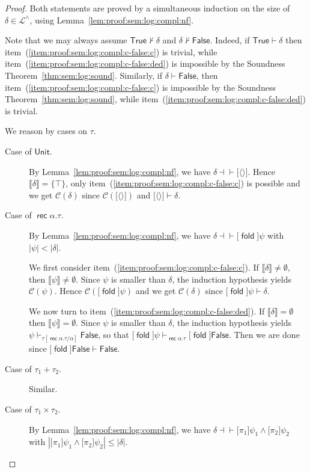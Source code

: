 \documentclass[%
  a4paper,
  UKenglish,
  cleveref,
  autoref,
  thm-restate,
  numberwithinsect,
]{lipics-v2021}
\newcommand\thesis{\vdash}
\newcommand\defthesisiff{\dashv\vdash}
\newcommand\thesisiff{\mathrel{\defthesisiff}}
\newcommand\pair[1]{{\langle #1\rangle}}
\newcommand\I[1]{\llbracket #1 \rrbracket} %
\newcommand\C{\mathcal{C}}		%
\newcommand\temp[1]{\mathsf{#1}}
\newcommand\True{\temp{True}}
\newcommand\False{\temp{False}}
\newcommand\term[1]{\mathsf{#1}}
\newcommand\type[1]{\term{#1}}
\newcommand\fold{\mathop{\term{fold}}}
\newcommand\Unit{\type{Unit}}
\newcommand\rec{\mathop{\type{rec}}}	%
\newcommand\TV{\alpha}		%
\newcommand\PT{\tau}		%
\newcommand\Lang{\mathcal{L}}
\newcommand\form[1]{\lbrack #1 \rbrack}
\begin{document}
\begin{proof}
Both statements are proved by a simultaneous induction on the 
size of $\delta \in \Lang^\land$,
using Lemma~\ref{lem:proof:sem:log:compl:nf}.

Note that we may always assume $\True \not\thesis \delta$
and $\delta \not\thesis \False$.
Indeed, if $\True \thesis \delta$ then
item~(\ref{item:proof:sem:log:compl:c-false:c}) is trivial,
while 
item~(\ref{item:proof:sem:log:compl:c-false:ded})
is impossible by the Soundness Theorem~\ref{thm:sem:log:sound}.
Similarly, if $\delta \thesis \False$,
then
item~(\ref{item:proof:sem:log:compl:c-false:c})
is impossible by the Soundness Theorem~\ref{thm:sem:log:sound},
while 
item~(\ref{item:proof:sem:log:compl:c-false:ded})
is trivial.

We reason by cases on $\PT$.
\begin{description}
\item[Case of $\Unit$.]
By Lemma~\ref{lem:proof:sem:log:compl:nf},
we have $\delta \thesisiff \form{\pair{}}$.
Hence $\I\delta = \{\top\}$,
only item~(\ref{item:proof:sem:log:compl:c-false:c})
is possible
and we get $\C(\delta)$ since $\C(\form{\pair{}})$ and $\form{\pair{}} \thesis \delta$.

\item[Case of $\rec\TV.\PT$.]
By Lemma~\ref{lem:proof:sem:log:compl:nf},
we have $\delta \thesisiff \form\fold\psi$
with $|\psi| < |\delta|$.

We first consider item~(\ref{item:proof:sem:log:compl:c-false:c}).
If $\I\delta \neq \emptyset$,
then $\I{\psi} \neq \emptyset$.
Since
$\psi$ is smaller than $\delta$,
the induction hypothesis
yields $\C(\psi)$.
Hence $\C(\form\fold \psi)$
and we get $\C(\delta)$ since $\form\fold \psi \thesis \delta$.

We now turn to item~(\ref{item:proof:sem:log:compl:c-false:ded}).
If $\I\delta = \emptyset$ then
$\I{\psi} = \emptyset$.
Since $\psi$ is smaller than $\delta$,
the induction hypothesis yields
$\psi \thesis_{\PT[\rec\TV.\PT/\TV]} \False$,
so that
$\form\fold\psi \thesis_{\rec\TV.\PT} \form\fold \False$.
Then we are done since $\form\fold \False \thesis \False$.

\item[Case of $\PT_1 + \PT_2$.]
Similar.

\item[Case of $\PT_1 \times \PT_2$.]
By Lemma~\ref{lem:proof:sem:log:compl:nf},
we have
$\delta \thesisiff \form{\pi_1}\psi_1 \land \form{\pi_2}\psi_2$
with
\(
  |\form{\pi_1}\psi_1 \land \form{\pi_2}\psi_2| \leq |\delta|
\).


\end{description}
\end{proof}
\end{document}
